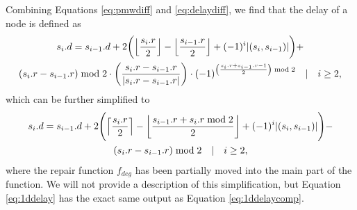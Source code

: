 Combining Equations \eqref{eq:pmwdiff} and \eqref{eq:delaydiff}, we find that the delay of a node is defined as
\begin{multline}\label{eq:1ddelaycomp}
  s_i.d = s_{i-1}.d + 2\bigg({\left \lfloor \frac{s_i.r}{2} \right \rfloor } - {\left \lfloor \frac{s_{i-1}.r}{2} \right \rfloor } + (-1)^{i}\abs{(s_i,s_{i-1})}\bigg) + \\
  (s_i.r - s_{i-1}.r) \bmod 2 \cdot \left(\frac{s_i.r - s_{i-1}.r}{\abs{s_i.r - s_{i-1}.r}}\right) \cdot (-1)^{\left(\frac{s_i.r+s_{i-1}.r-1}{2}\right)\bmod 2} \hspace{1em} | \hspace{1em} i\geq 2,
\end{multline}
which can be further simplified to 
\begin{multline}\label{eq:1ddelay}
  s_i.d = s_{i-1}.d + 2\Bigg({\left \lceil \frac{s_i.r}{2} \right \rceil } - {\left \lfloor \frac{s_{i-1}.r + s_i.r \bmod 2}{2} \right \rfloor } + (-1)^{i}\abs{(s_i,s_{i-1})}\Bigg) - \\
  (s_i.r - s_{i-1}.r) \bmod 2 \hspace{1em} | \hspace{1em} i\geq 2,
\end{multline}
where the repair function $f_{deg}$ has been partially moved into the main part of the function. We will not provide a description of this simplification, but Equation \eqref{eq:1ddelay} has the exact same output as Equation \eqref{eq:1ddelaycomp}. 

